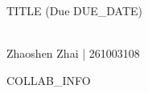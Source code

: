 \documentclass{article}
\theoremstyle{definition}\newmdtheoremenv[style = light]{exercise}{Exercise}
\theoremstyle{definition}\newmdtheoremenv[style = light]{exerciseUnnumbered}{Exercise\!\!}
\begin{document}
    \begin{center}
        \large{TITLE (Due DUE_DATE)}\\\ \\
        \begin{minipage}{0.3\textwidth}
            \begin{center}
                \normalsize{Zhaoshen Zhai | 261003108}
            \end{center}
        \end{minipage}
        \begin{minipage}{0.3\textwidth}
            \begin{center}
                \normalsize{COLLAB_INFO}
            \end{center}
        \end{minipage}
    \end{center}

    \setcounter{exercise}{0}

    \begin{exercise}
        
    \end{exercise}
    \begin{solution}
        
    \end{solution}
\end{document}
